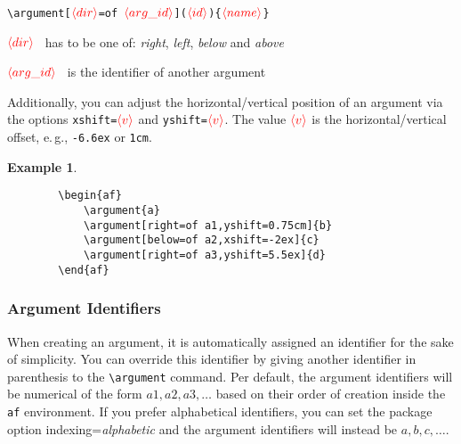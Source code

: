 \documentclass[headings=normal]{scrartcl}
\newcommand{\opt}[2][red]{\ensuremath{\textcolor{#1}{\langle #2\rangle}}}
\newtheorem{example}{Example}
\begin{document}
    \noindent
    \verb|\argument[|\opt{dir}\verb|=of |\opt{arg\_id}\verb|](|\opt{id}\verb|){|\opt{name}\verb|}|
    
    \begin{list}{}{\leftmargin=\parindent\rightmargin=0pt}
        \item\opt{dir}~ has to be one of: \emph{right}, \emph{left}, \emph{below} and \emph{above} 
        \item\opt{arg\_id}~ is the identifier of another argument
        \item Additionally, you can adjust the horizontal/vertical position of an argument via the options \verb|xshift=|\opt{v} and \verb|yshift=|\opt{v}.
        The value \opt{v} is the horizontal/vertical offset, e.\,g., \verb|-6.6ex| or \verb|1cm|.
    \end{list}


    \begin{example}~

    \begin{minipage}{0.25\textwidth}
        \begin{center}
        \begin{af}
        \end{af}
        \end{center}
    \end{minipage}%
    \begin{minipage}{0.5\textwidth}
        \begin{verbatim}
        \begin{af}
            \argument{a}
            \argument[right=of a1,yshift=0.75cm]{b}
            \argument[below=of a2,xshift=-2ex]{c}
            \argument[right=of a3,yshift=5.5ex]{d}
        \end{af}
        \end{verbatim}
    \end{minipage}%
    \end{example}


\subsubsection{Argument Identifiers}
    When creating an argument, it is automatically assigned an identifier for the sake of simplicity.
    You can override this identifier by giving another identifier in parenthesis to the \verb|\argument| command.
    Per default, the argument identifiers will be numerical of the form $a1, a2, a3, \dots$ based on their order of creation inside the \texttt{af} environment.
    If you prefer alphabetical identifiers, you can set the package option \textsf{indexing}=\emph{alphabetic} and the argument identifiers will instead be $a, b, c, \dots$.
\end{document}
